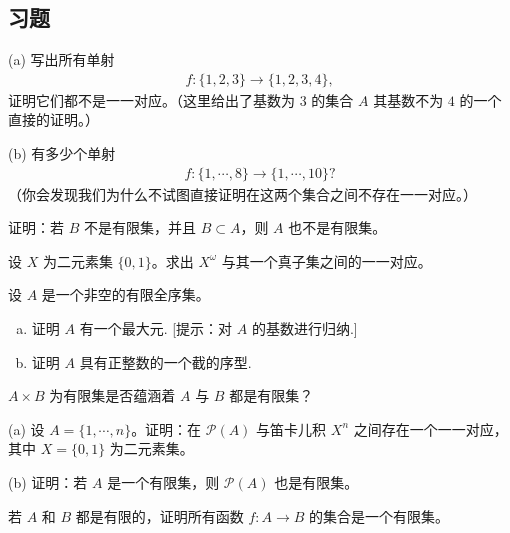 \documentclass[../../main.tex]{subfiles}
\begin{document}
\subsection*{习题}

\begin{exercise}\label{exercise:ch01-有限集-1}
(a) 写出所有单射
\begin{align*}
f: \{1, 2, 3\} \longrightarrow \{1, 2, 3, 4\},
\end{align*}
证明它们都不是一一对应。（这里给出了基数为 $3$ 的集合 $A$ 其基数不为 $4$ 的一个直接的证明。）

(b) 有多少个单射
\begin{align*}
f: \{1, \cdots, 8\} \longrightarrow \{1, \cdots, 10\}?
\end{align*}
（你会发现我们为什么不试图直接证明在这两个集合之间不存在一一对应。）
\end{exercise}

\begin{exercise}\label{exercise:ch01-有限集-2}
证明：若 $B$ 不是有限集，并且 $B \subset A$，则 $A$ 也不是有限集。
\end{exercise}

\begin{exercise}\label{exercise:ch01-有限集-3}
设 $X$ 为二元素集 $\{0, 1\}$。求出 $X^{\omega}$ 与其一个真子集之间的一一对应。
\end{exercise}

\begin{exercise}\label{exercise:ch01-有限集-4}
设 $A$ 是一个非空的有限全序集。
\begin{enumerate}[(a)]
\item 证明 $A$ 有一个最大元. [提示：对 $A$ 的基数进行归纳.]
\item 证明 $A$ 具有正整数的一个截的序型.
\end{enumerate}
\end{exercise}

\begin{exercise}\label{exercise:ch01-有限集-5}
$A \times B$ 为有限集是否蕴涵着 $A$ 与 $B$ 都是有限集？
\end{exercise}

\begin{exercise}\label{exercise:ch01-有限集-6}
(a) 设 $A = \{1, \cdots, n\}$。证明：在 $\mathcal{P}(A)$ 与笛卡儿积 $X^{n}$ 之间存在一个一一对应，其中 $X = \{0, 1\}$ 为二元素集。

(b) 证明：若 $A$ 是一个有限集，则 $\mathcal{P}(A)$ 也是有限集。
\end{exercise}

\begin{exercise}\label{exercise:ch01-有限集-7}
若 $A$ 和 $B$ 都是有限的，证明所有函数 $f: A \longrightarrow B$ 的集合是一个有限集。
\end{exercise}
\end{document}
